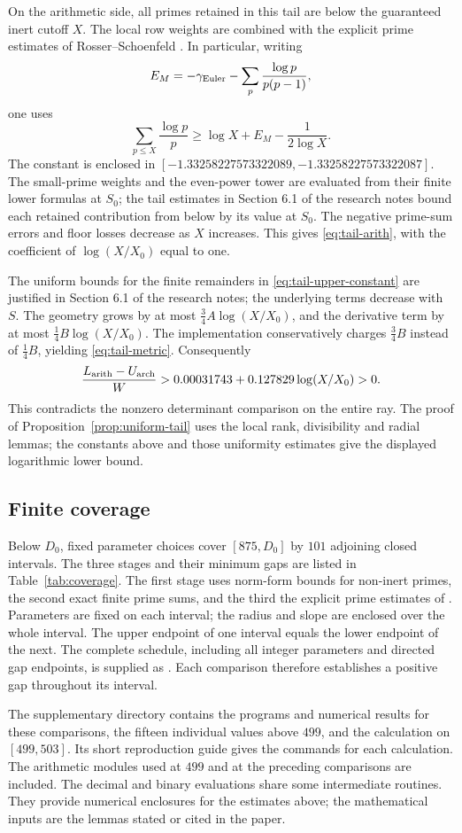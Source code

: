On the arithmetic side, all primes retained in this tail are below the guaranteed inert cutoff $X$. The local row weights are combined with the explicit prime estimates of Rosser--Schoenfeld \cite[Theorems~4, 6 and 18]{rosserschoenfeld}. In particular, writing
\[
 E_M=-\gamma_{\rm Euler}-\sum_p\frac{\log p}{p(p-1)},
\]
one uses
\[
 \sum_{p\leq X}\frac{\log p}{p}
 \geq\log X+E_M-\frac1{2\log X}.
\]
The constant is enclosed in
$[-1.33258227573322089,-1.33258227573322087]$.
The small-prime weights and the even-power tower are evaluated from their finite lower formulas at $S_0$; the tail estimates in Section 6.1 of the research notes bound each retained contribution
from below by its value at $S_0$. The negative prime-sum errors and floor losses decrease as $X$ increases. This gives \eqref{eq:tail-arith}, with the coefficient of $\log(X/X_0)$ equal to one.

The uniform bounds for the finite remainders in
\eqref{eq:tail-upper-constant} are justified in Section 6.1 of the research notes; the
underlying terms decrease with $S$. The geometry grows by at most $\tfrac34A\log(X/X_0)$, and the derivative term by at most $\tfrac14B\log(X/X_0)$. The implementation conservatively charges $\tfrac34B$ instead of $\tfrac14B$, yielding \eqref{eq:tail-metric}. Consequently
\begin{equation}\label{eq:tail-positive}
 \frac{L_{\rm arith}-U_{\rm arch}}W
 >0.00031743+0.127829\log(X/X_0)>0.
\end{equation}
This contradicts the nonzero determinant comparison on the entire ray. The proof of Proposition~\ref{prop:uniform-tail} uses the local rank, divisibility and radial lemmas; the constants above and those uniformity estimates give the displayed
logarithmic lower bound.

\subsection{Finite coverage}
Below $D_0$, fixed parameter choices cover $[875,D_0]$ by $101$ adjoining closed intervals. The three stages and their minimum gaps are listed in Table~\ref{tab:coverage}.
The first stage uses norm-form bounds for non-inert primes, the second exact finite prime sums, and the third the explicit prime estimates of \cite{rosserschoenfeld}. Parameters are fixed on each interval; the radius and slope are enclosed over the whole interval. The upper endpoint of one interval equals the lower endpoint of the next. The complete schedule, including all integer parameters and directed gap endpoints, is supplied as . Each comparison therefore establishes a positive gap throughout its interval.

The supplementary directory  contains the programs and
numerical results for these comparisons, the fifteen individual values above
$499$, and the calculation on $[499,503]$. Its short reproduction guide gives
the commands for each calculation. The arithmetic modules used at $499$ and at the preceding comparisons are included. The decimal and binary evaluations share some intermediate
routines. They provide numerical enclosures for the estimates above; the
mathematical inputs are the lemmas stated or cited in the paper.
